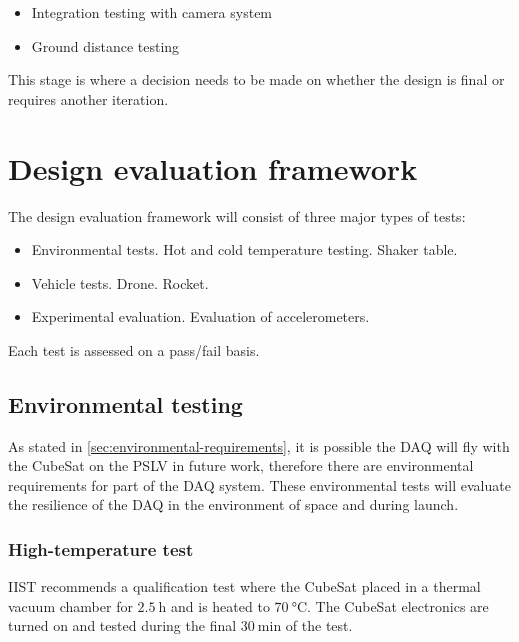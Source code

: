 \documentclass[draft]{report}
\begin{document}
\begin{itemize}
  \item Integration testing with camera system %
  \item Ground distance testing %
\end{itemize}

This stage is where a decision needs to be made on whether the design is final or requires another iteration.

\section{Design evaluation framework}

The design evaluation framework will consist of three major types of tests:

\begin{itemize}
  \item Environmental tests.
        \subitem Hot and cold temperature testing.
        \subitem Shaker table.
  \item Vehicle tests.
        \subitem Drone.
        \subitem Rocket.
  \item Experimental evaluation.
        \subitem Evaluation of accelerometers.
\end{itemize}

Each test is assessed on a pass/fail basis.

\subsection{Environmental testing}

As stated in \ref{sec:environmental-requirements}, it is possible the DAQ will fly with the CubeSat on the PSLV in future work, therefore there are environmental requirements for part of the DAQ system.
These environmental tests will evaluate the resilience of the DAQ in the environment of space and during launch.

\subsubsection{High-temperature test}
\label{sec:htemp-test-framework}
IIST recommends a qualification test where the CubeSat placed in a thermal vacuum chamber for $\SI{2.5}{\hour}$ and is heated to $\SI{70}{\degreeCelsius}$. The CubeSat electronics are turned on and tested during the final $\SI{30}{\minute}$ of the test.
\end{document}
